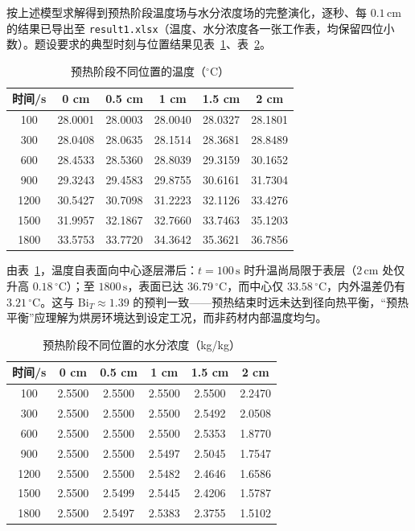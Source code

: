 按上述模型求解得到预热阶段温度场与水分浓度场的完整演化，逐秒、每 $0.1\,\mathrm{cm}$ 的结果已导出至 \texttt{result1.xlsx}（温度、水分浓度各一张工作表，均保留四位小数）。题设要求的典型时刻与位置结果见表~\ref{tab:q1-T}、表~\ref{tab:q1-C}。

\begin{table}[htbp]
\centering
\caption{预热阶段不同位置的温度（$^\circ$C）}
\label{tab:q1-T}
\begin{tabular}{cccccc}
\toprule
时间/s & 0 cm & 0.5 cm & 1 cm & 1.5 cm & 2 cm \\
\midrule
100  & 28.0001 & 28.0003 & 28.0040 & 28.0327 & 28.1801 \\
300  & 28.0408 & 28.0635 & 28.1514 & 28.3681 & 28.8489 \\
600  & 28.4533 & 28.5360 & 28.8039 & 29.3159 & 30.1652 \\
900  & 29.3243 & 29.4583 & 29.8755 & 30.6161 & 31.7304 \\
1200 & 30.5427 & 30.7098 & 31.2223 & 32.1126 & 33.4276 \\
1500 & 31.9957 & 32.1867 & 32.7660 & 33.7463 & 35.1203 \\
1800 & 33.5753 & 33.7720 & 34.3642 & 35.3621 & 36.7856 \\
\bottomrule
\end{tabular}
\end{table}

由表~\ref{tab:q1-T}，温度自表面向中心逐层滞后：$t=100\,\mathrm{s}$ 时升温尚局限于表层（$2\,\mathrm{cm}$ 处仅升高 $0.18\,^\circ\mathrm{C}$）；至 $1800\,\mathrm{s}$，表面已达 $36.79\,^\circ\mathrm{C}$，而中心仅 $33.58\,^\circ\mathrm{C}$，内外温差仍有 $3.21\,^\circ\mathrm{C}$。这与 $\mathrm{Bi}_T\approx1.39$ 的预判一致——预热结束时远未达到径向热平衡，``预热平衡''应理解为烘房环境达到设定工况，而非药材内部温度均匀。

\begin{table}[htbp]
\centering
\caption{预热阶段不同位置的水分浓度（kg/kg）}
\label{tab:q1-C}
\begin{tabular}{cccccc}
\toprule
时间/s & 0 cm & 0.5 cm & 1 cm & 1.5 cm & 2 cm \\
\midrule
100  & 2.5500 & 2.5500 & 2.5500 & 2.5500 & 2.2470 \\
300  & 2.5500 & 2.5500 & 2.5500 & 2.5492 & 2.0508 \\
600  & 2.5500 & 2.5500 & 2.5500 & 2.5353 & 1.8770 \\
900  & 2.5500 & 2.5500 & 2.5497 & 2.5045 & 1.7547 \\
1200 & 2.5500 & 2.5500 & 2.5482 & 2.4646 & 1.6586 \\
1500 & 2.5500 & 2.5499 & 2.5445 & 2.4206 & 1.5787 \\
1800 & 2.5500 & 2.5497 & 2.5383 & 2.3755 & 1.5102 \\
\bottomrule
\end{tabular}
\end{table}

